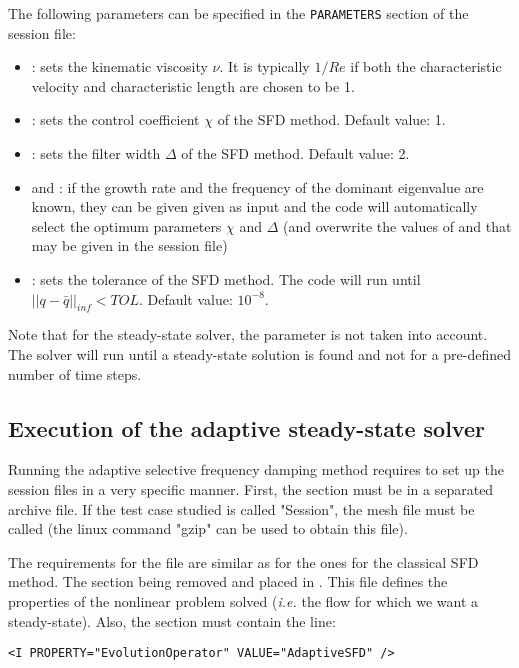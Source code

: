 The following parameters can be specified in the \texttt{PARAMETERS} section of the session file:

\begin{itemize}
\item {}: sets the kinematic viscosity $\nu$. It is typically $1/Re$ if both the characteristic velocity and characteristic length are chosen to be 1. 
\item {}: sets the control coefficient $\chi$ of the SFD method. Default value: 1.
\item {}: sets the filter width $\Delta$ of the SFD method. Default value: 2.
\item {} and : if the growth rate and the frequency of the dominant eigenvalue are known, they can be given given as input and the code will automatically select the optimum parameters $\chi$ and $\Delta$ (and overwrite the values of  and  that may be given in the session file)
\item {}: sets the tolerance of the SFD method. The code will run until $||q-\bar{q}||_{inf}<TOL$.  Default value: $10^{-8}$.
\end{itemize}

Note that for the steady-state solver, the parameter  is not taken into account. The solver will run until a steady-state solution is found and not for a pre-defined number of time steps.

\subsection{Execution of the adaptive steady-state solver}

Running the adaptive selective frequency damping method requires to set up the session files in a very specific manner. First, the  section must be in a separated archive file. If the test case studied is called "Session", the mesh file must be called  (the linux command "gzip" can be used to obtain this file).

The requirements for the file  are similar as for the ones for the classical SFD method. The  section being removed and placed in . This file defines the properties of the nonlinear problem solved (\textit{i.e.} the flow for which we want a steady-state). Also, the  section must contain the line:
\begin{lstlisting}[style=XMLStyle]
<I PROPERTY="EvolutionOperator" VALUE="AdaptiveSFD" />
\end{lstlisting}

